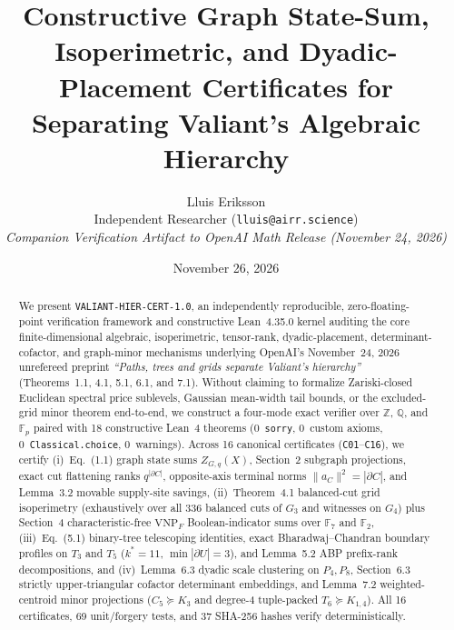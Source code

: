 \documentclass[10pt,twocolumn]{article}
\title{\textbf{Constructive Graph State-Sum, Isoperimetric, and Dyadic-Placement Certificates for Separating Valiant's Algebraic Hierarchy}}
\author{Lluis Eriksson\\
\small Independent Researcher \quad(\texttt{lluis@airr.science})\\
\small \textit{Companion Verification Artifact to OpenAI Math Release (November 24, 2026)}}
\date{November 26, 2026}
\begin{document}
\raggedbottom
\maketitle

\begin{abstract}
We present \texttt{VALIANT-HIER-CERT-1.0}, an independently reproducible, zero-floating-point verification framework and constructive Lean~4.35.0 kernel auditing the core finite-dimensional algebraic, isoperimetric, tensor-rank, dyadic-placement, determinant-cofactor, and graph-minor mechanisms underlying OpenAI's November~24, 2026 unrefereed preprint \emph{``Paths, trees and grids separate Valiant's hierarchy''} (Theorems~1.1, 4.1, 5.1, 6.1, and 7.1). Without claiming to formalize Zariski-closed Euclidean spectral price sublevels, Gaussian mean-width tail bounds, or the excluded-grid minor theorem end-to-end, we construct a four-mode exact verifier over $\mathbb{Z}$, $\mathbb{Q}$, and $\mathbb{F}_p$ paired with 18 constructive Lean~4 theorems (0~\texttt{sorry}, 0~custom axioms, 0~\texttt{Classical.choice}, 0~warnings). Across 16 canonical certificates (\texttt{C01}--\texttt{C16}), we certify (i)~Eq.~(1.1) graph state sums $Z_{G,q}(X)$, Section~2 subgraph projections, exact cut flattening ranks $q^{|\partial C|}$, opposite-axis terminal norms $\|a_C\|^2=|\partial C|$, and Lemma~3.2 movable supply-site savings, (ii)~Theorem~4.1 balanced-cut grid isoperimetry (exhaustively over all 336 balanced cuts of $G_3$ and witnesses on $G_4$) plus Section~4 characteristic-free $\mathrm{VNP}_F$ Boolean-indicator sums over $\mathbb{F}_7$ and $\mathbb{F}_2$, (iii)~Eq.~(5.1) binary-tree telescoping identities, exact Bharadwaj--Chandran boundary profiles on $T_3$ and $T_5$ ($k^*=11$, $\min|\partial U|=3$), and Lemma~5.2 ABP prefix-rank decompositions, and (iv)~Lemma~6.3 dyadic scale clustering on $P_4, P_8$, Section~6.3 strictly upper-triangular cofactor determinant embeddings, and Lemma~7.2 weighted-centroid minor projections ($C_5 \succeq K_3$ and degree-4 tuple-packed $T_6 \succeq K_{1,4}$). All 16 certificates, 69 unit/forgery tests, and 37 SHA-256 hashes verify deterministically.
\end{abstract}
\end{document}
